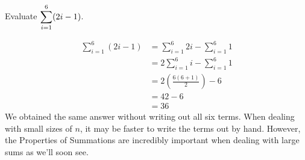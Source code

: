 \begin{example} %
Evaluate $\displaystyle  \sum_{i=1}^6 (2i-1)$. 

\solution 
\begin{align*}
\sum_{i=1}^6 (2i-1) & = \sum_{i=1}^6 2i - \sum_{i=1}^6 1 \\
& = 2\sum_{i=1}^6 i - \sum_{i=1}^6 1 \\
& = 2 \left( \frac{6(6+1)}{2} \right) - 6 \\
& = 42-6 \\
& = 36
\end{align*}
We obtained the same answer without writing out all six terms. When dealing with small sizes of $n$, it may be faster to write the terms out by hand. However, the Properties of Summations are incredibly important when dealing with large sums as we'll soon see.
\end{example}
